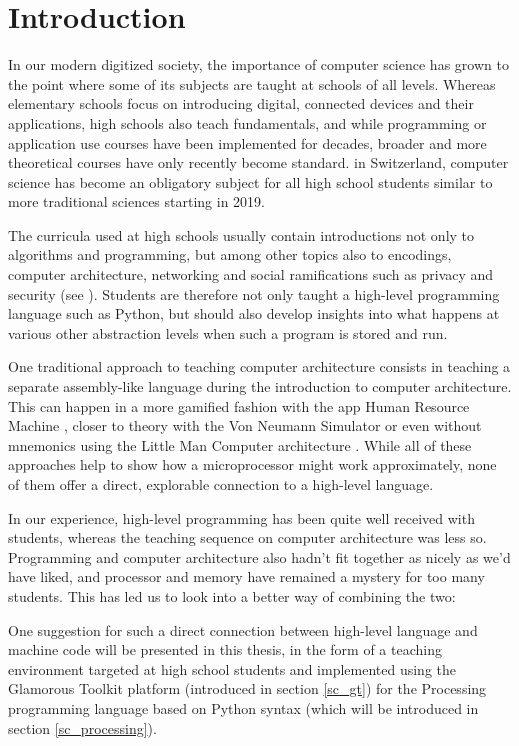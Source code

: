 
\chapter{Introduction}

In our modern digitized society, the importance of computer science has grown to the point where some of its subjects are taught at schools of all levels. Whereas elementary schools focus on introducing digital, connected devices and their applications, high schools also teach fundamentals, and while programming or application use courses have been implemented for decades, broader and more theoretical courses have only recently become standard. \eg in Switzerland, computer science has become an obligatory subject for all high school students similar to more traditional sciences starting in 2019.

The curricula used at high schools usually contain introductions not only to algorithms and programming, but among other topics also to encodings, computer architecture, networking and social ramifications such as privacy and security (see \eg \cite{Erz16}). Students are therefore not only taught a high-level programming language such as Python, but should also develop insights into what happens at various other abstraction levels when such a program is stored and run.

One traditional approach to teaching computer architecture consists in teaching a separate assembly-like language during the introduction to computer architecture. This can happen in a more gamified fashion \eg with the app Human Resource Machine \cite{Tom15}, closer to theory with the Von Neumann Simulator \cite{Gan23} or even without mnemonics using the Little Man Computer architecture \cite{Oin25}. While all of these approaches help to show how a microprocessor might work approximately, none of them offer a direct, explorable connection to a high-level language.

In our experience, high-level programming has been quite well received with students, whereas the teaching sequence on computer architecture was less so. Programming and computer architecture also hadn't fit together as nicely as we'd have liked, and processor and memory have remained a mystery for too many students. This has led us to look into a better way of combining the two:

One suggestion for such a direct connection between high-level language and machine code will be presented in this thesis, in the form of a teaching environment targeted at high school students and implemented using the Glamorous Toolkit platform (introduced in section \ref{sc_gt}) for the Processing programming language based on Python syntax (which will be introduced in section \ref{sc_processing}).

